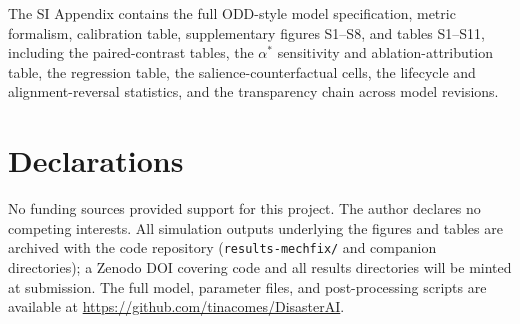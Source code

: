 \documentclass[pdflatex,sn-nature]{sn-jnl}
\begin{document}
\backmatter

The SI Appendix contains the full ODD-style model specification, metric formalism, calibration table, supplementary figures S1--S8, and tables S1--S11, including the paired-contrast tables, the $\alpha^{*}$ sensitivity and ablation-attribution table, the regression table, the salience-counterfactual cells, the lifecycle and alignment-reversal statistics, and the transparency chain across model revisions.


\section*{Declarations}

 No funding sources provided support for this project.
 The author declares no competing interests.
 All simulation outputs underlying the figures and tables are archived with the code repository (\texttt{results-mechfix/} and companion directories); a Zenodo DOI covering code and all results directories will be minted at submission.
 The full model, parameter files, and post-processing scripts are available at \url{https://github.com/tinacomes/DisasterAI}.


\end{document}
